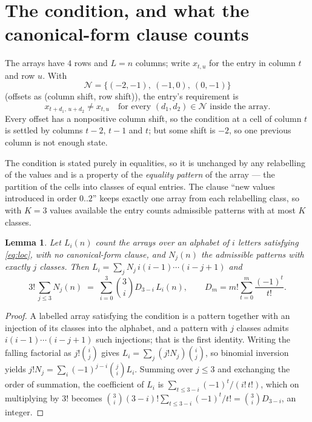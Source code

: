 \documentclass[11pt,a4paper]{article}
\theoremstyle{plain}
\newtheorem{lemma}[theorem]{Lemma}
\theoremstyle{definition}
\begin{document}
\section{The condition, and what the canonical-form clause counts}

The arrays have $4$ rows and $L=n$ columns; write $x_{t,u}$ for the entry in
column $t$ and row $u$. With
\[
\mathcal N=\{(-2,-1),\ (-1,0),\ (0,-1)\}
\]
(offsets as (column shift, row shift)), the entry's requirement is
\begin{equation}\label{eq:loc}
x_{t+d_1,\,u+d_2}\ne x_{t,u}\quad\text{for every }(d_1,d_2)\in\mathcal N\text{ inside the array}.
\end{equation}
Every offset has a nonpositive column shift, so the condition at a cell of column $t$ is
settled by columns $t-2$, $t-1$ and $t$; but some shift is $-2$, so one previous column is not
enough state.

The condition is stated purely in equalities, so it is unchanged by any relabelling of the
values and is a property of the \emph{equality pattern} of the array --- the partition of
the cells into classes of equal entries. The clause ``new values introduced in order
$0..2$'' keeps exactly one array from each relabelling class, so with $K=3$ values
available the entry counts admissible patterns with at most $K$ classes.

\begin{lemma}\label{lem:inv}
Let $L_i(n)$ count the arrays over an alphabet of $i$ letters satisfying \eqref{eq:loc},
with no canonical-form clause, and $N_j(n)$ the admissible patterns with exactly $j$ classes.
Then $L_i=\sum_j N_j\,i(i-1)\cdots(i-j+1)$ and
\[
3!\,\sum_{j\le 3}N_j(n)\;=\;\sum_{i=0}^{3}\binom{3}{i}D_{3-i}\,L_i(n),
\qquad D_m=m!\sum_{t=0}^{m}\frac{(-1)^t}{t!} .
\]
\end{lemma}

\begin{proof}
A labelled array satisfying the condition is a pattern together with an injection of its
classes into the alphabet, and a pattern with $j$ classes admits $i(i-1)\cdots(i-j+1)$ such
injections; that is the first identity. Writing the falling factorial as $j!\binom{i}{j}$
gives $L_i=\sum_j(j!N_j)\binom{i}{j}$, so binomial inversion yields
$j!N_j=\sum_i(-1)^{j-i}\binom{j}{i}L_i$. Summing over $j\le3$ and exchanging the
order of summation, the coefficient of $L_i$ is $\sum_{t\le3-i}(-1)^t/(i!\,t!)$, which on
multiplying by $3!$ becomes
$\binom{3}{i}(3-i)!\sum_{t\le3-i}(-1)^t/t!=\binom{3}{i}D_{3-i}$, an
integer.
\end{proof}
\end{document}
